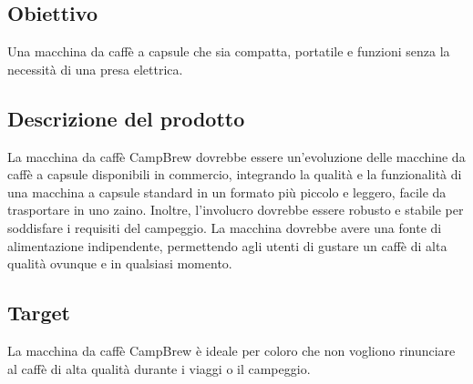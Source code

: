 \documentclass{article}
\begin{document}
\subsection*{Obiettivo}
Una macchina da caffè a capsule che sia compatta, portatile e funzioni senza la necessità di una presa elettrica.

\subsection*{Descrizione del prodotto}
La macchina da caffè CampBrew dovrebbe essere un'evoluzione delle macchine da caffè a capsule disponibili in commercio, integrando la qualità e la funzionalità di una macchina a capsule standard in un formato più piccolo e leggero, facile da trasportare in uno zaino. Inoltre, l'involucro dovrebbe essere robusto e stabile per soddisfare i requisiti del campeggio. La macchina dovrebbe avere una fonte di alimentazione indipendente, permettendo agli utenti di gustare un caffè di alta qualità ovunque e in qualsiasi momento.

\subsection*{Target}
La macchina da caffè CampBrew è ideale per coloro che non vogliono rinunciare al caffè di alta qualità durante i viaggi o il campeggio.
\end{document}
